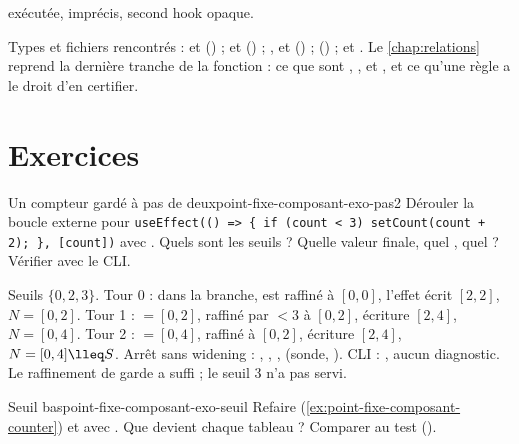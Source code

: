 \begin{resume}
\begin{itemize}
    exécutée,  imprécis, second hook opaque.
\end{itemize}
\begin{sloppypar}
Types et fichiers rencontrés :  et 
() ;  et 
() ; , 
et  () ;
 () ; 
et . Le \cref{chap:relations} reprend la dernière
tranche de la fonction : ce que sont ,
,  et ,
et ce qu'une règle a le droit d'en certifier.
\end{sloppypar}
\end{resume}

\section*{Exercices}

\begin{exercice}{Un compteur gardé à pas de deux}{point-fixe-composant-exo-pas2}
Dérouler la boucle externe pour
\texttt{useEffect(() => \{ if (count < 3) setCount(count + 2); \}, [count])}
avec . Quels sont les seuils ? Quelle valeur finale, quel
, quel  ? Vérifier avec le CLI.
\end{exercice}
\begin{solution}
Seuils $\{0, 2, 3\}$. Tour 0 : dans la branche,  est raffiné à
$[0,0]$, l'effet écrit $[2,2]$, $N = [0,2]$. Tour 1 :  $= [0,2]$,
raffiné par $< 3$ à $[0,2]$, écriture $[2,4]$, $N = [0,4]$. Tour 2 :
 $= [0,4]$, raffiné à $[0,2]$, écriture $[2,4]$, $N = [0,4] \lleq S$.
Arrêt sans widening : , ,
,  (sonde,
). CLI : ,
aucun diagnostic. Le raffinement de garde a suffi ; le seuil 3 n'a pas
servi.
\end{solution}

\begin{exercice}{Seuil bas}{point-fixe-composant-exo-seuil}
Refaire  (\cref{ex:point-fixe-composant-counter}) et
 avec . Que devient chaque tableau ?
Comparer au test 
().
\end{exercice}

